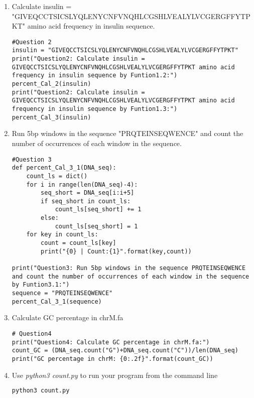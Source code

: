 \documentclass[a4paper]{article}
\begin{document}
\begin{enumerate}
\begin{lstlisting}[language=Python]
    	\end{lstlisting}
        \item Calculate insulin =  "GIVEQCCTSICSLYQLENYCNFVNQHLCGSHLVEALYLVCGERGFFYTPKT" amino acid frequency in insulin sequence.
        \begin{lstlisting}
#Question 2 
insulin = "GIVEQCCTSICSLYQLENYCNFVNQHLCGSHLVEALYLVCGERGFFYTPKT"
print("Question2: Calculate insulin = GIVEQCCTSICSLYQLENYCNFVNQHLCGSHLVEALYLVCGERGFFYTPKT amino acid frequency in insulin sequence by Funtion1.2:")
percent_Cal_2(insulin)
print("Question2: Calculate insulin = GIVEQCCTSICSLYQLENYCNFVNQHLCGSHLVEALYLVCGERGFFYTPKT amino acid frequency in insulin sequence by Funtion1.3:")
percent_Cal_3(insulin)       
        \end{lstlisting}
        \item Run 5bp windows in the sequence "PRQTEINSEQWENCE" and count the number of occurrences of each window in the sequence.
        \begin{lstlisting}
#Question 3
def percent_Cal_3_1(DNA_seq):
    count_ls = dict()
    for i in range(len(DNA_seq)-4):
        seq_short = DNA_seq[i:i+5]
        if seq_short in count_ls:
            count_ls[seq_short] += 1
        else:
            count_ls[seq_short] = 1
    for key in count_ls:
        count = count_ls[key]
        print("{0} | Count:{1}".format(key,count))

print("Question3: Run 5bp windows in the sequence PRQTEINSEQWENCE and count the number of occurrences of each window in the sequence by Funtion3.1:")
sequence = "PRQTEINSEQWENCE"
percent_Cal_3_1(sequence)      
        \end{lstlisting}
        
        \item Calculate GC percentage in chrM.fa
        \begin{lstlisting}
# Question4
print("Question4: Calculate GC percentage in chrM.fa:")
count_GC = (DNA_seq.count("G")+DNA_seq.count("C"))/len(DNA_seq)
print("GC percentage in chrM: {0:.2f}".format(count_GC))        
        \end{lstlisting}
        
        \item Use \textit{python3 count.py} to run your program from the command line
		\begin{lstlisting}[language=bash]
python3 count.py		
		\end{lstlisting}
	
    \end{enumerate}
\end{document}
